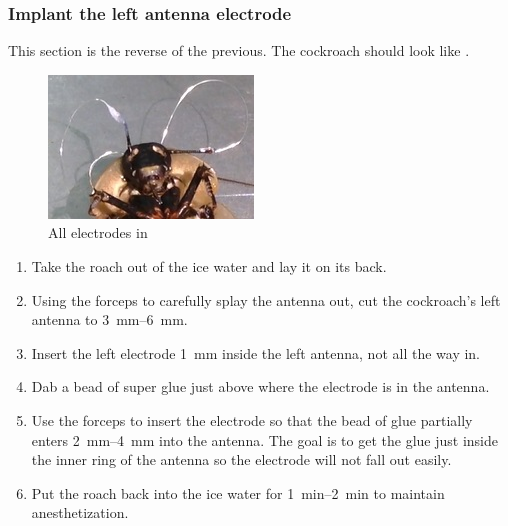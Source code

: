 \subsubsection{Implant the left antenna electrode}
This section is the reverse of the previous. The cockroach should look like .
\begin{figure}[ht!]
\centering
\includegraphics[scale=0.7]{Surgery Photos/lelectrode.jpg}
\caption{All electrodes in}
\label{fig:lelectrode}
\end{figure}
\begin{enumerate}
\item Take the roach out of the ice water and lay it on its back.
\item Using the forceps to carefully splay the antenna out, cut the cockroach's left antenna to \SIrange{3}{6}{\milli\meter}.
\item Insert the left electrode \SI{1}{\milli\meter} inside the left antenna, not all the way in.
\item Dab a bead of super glue just above where the electrode is in the antenna.
\item Use the forceps to insert the electrode so that the bead of glue partially enters \SIrange{2}{4}{\milli\meter} into the antenna.
	\subitem The goal is to get the glue just inside the inner ring of the antenna so the electrode will not fall out easily.
\item Put the roach back into the ice water for \SIrange{1}{2}{\minute} to maintain anesthetization.
\end{enumerate}
      
      
      
      
      
      
      
